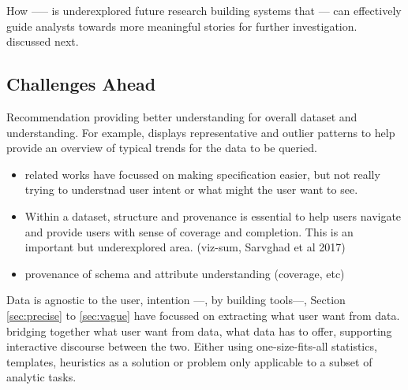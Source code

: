 How ----- is underexplored 
future research 
building systems that ---
can effectively guide analysts towards more meaningful stories for further investigation.
discussed next.
\subsection{Challenges Ahead}
Recommendation providing better understanding for overall dataset and understanding. For example, \zv displays representative and outlier patterns to help provide
an overview of typical trends for the data to be queried. 

\begin{itemize}
\item related works have focussed on making specification easier, but not really trying to understnad user intent or what might the user want to see.
\item Within a dataset, structure and provenance is essential to help users navigate and provide users with sense of coverage and completion. This is an important but underexplored area. (viz-sum, Sarvghad et al 2017)
\item provenance of schema and attribute understanding (coverage, etc) 
\end{itemize}

Data is agnostic to the user, intention ---, by building tools---, Section \ref{sec:precise} to \ref{sec:vague} have focussed on extracting what user want from data. bridging together what user want from data, what data has to offer, supporting interactive discourse between the two. 
 Either using one-size-fits-all statistics, templates, heuristics as a solution or problem only applicable to a subset of analytic tasks\cite{Vartak2015,Vartak2017}. 

